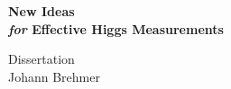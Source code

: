 \documentclass[a4paper,
	oneside,
        openright,
	cleardoublepage=plain,
	12pt,
        DIV=16]{scrreprt}
\newcommand{\tptitle}[1]{{\Huge \bfseries \color{cover-foreground} #1}}
\newcommand{\tpauthor}[1]{{\Large \color{cover-foreground} #1}}
\begin{document}

\begin{titlepage}
  \pagestyle{empty}
  \pagecolor{cover-background}
  \begin{center}

    \vspace*{5cm}

    \tptitle{New Ideas\\[0.7cm]
     {\mdseries \textit{for}} Effective Higgs Measurements}


    \vfill

    \tpauthor{Dissertation\\[0.7cm]
    Johann Brehmer}

    \vspace*{2cm}

  \end{center}
\end{titlepage}
\end{document}
